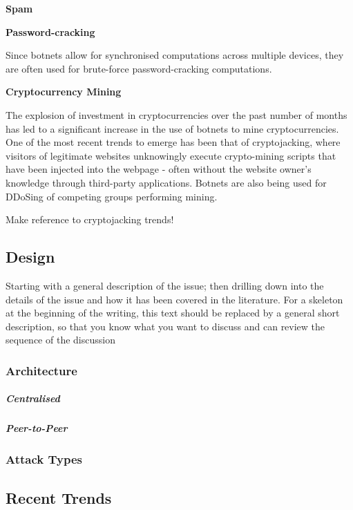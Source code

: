 \bullet \textbf{Spam}

\bullet \textbf{Password-cracking}

Since botnets allow for synchronised computations across multiple devices, they are often used for brute-force password-cracking computations.

\bullet \textbf{Cryptocurrency Mining}

The explosion of investment in cryptocurrencies over the past number of months has led to a significant increase in the use of botnets to mine cryptocurrencies. One of the most recent trends to emerge has been that of cryptojacking, where visitors of legitimate websites unknowingly execute crypto-mining scripts that have been injected into the webpage - often without the website owner's knowledge through third-party applications. Botnets are also being used for DDoSing of competing groups performing mining.

Make reference to cryptojacking trends!

\subsection{Design}

Starting with a general description of the issue; then drilling down into the details of the issue and how it has been covered in the literature. For a skeleton at the beginning of the writing, this text should be replaced by a general short description, so that you know what you want to discuss and can review the sequence of the discussion

\subsubsection{Architecture}
\subparagraph{Centralised}
\subparagraph{Peer-to-Peer}

\subsubsection{Attack Types}


\subsection{Recent Trends}


